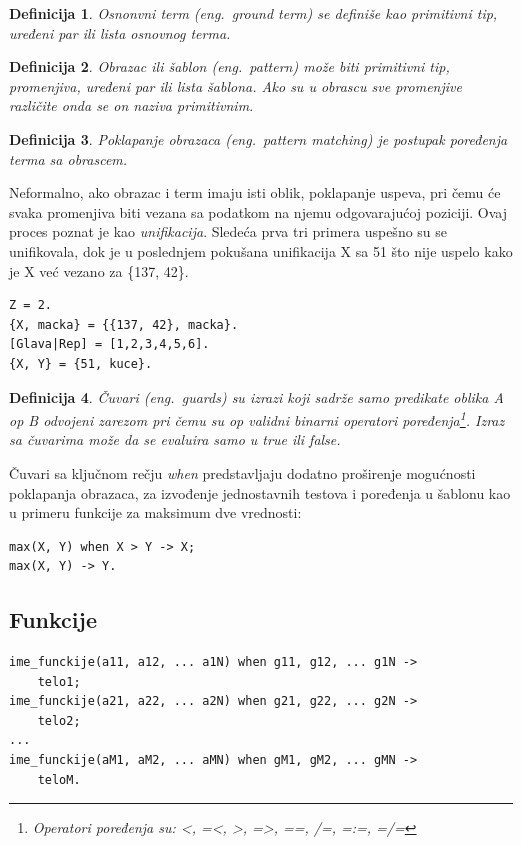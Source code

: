 \documentclass[a4paper]{article}
\newtheorem{definition}{Definicija}
\begin{document}
{\theoremstyle{definition}
\begin{definition}{Osnonvni term (eng.~{\em ground term})}
se definiše kao primitivni tip, uređeni par ili lista osnovnog terma.
\end{definition}

\begin{definition}{Obrazac ili šablon (eng.~{\em pattern})}
može biti primitivni tip, promenjiva, uređeni par ili lista šablona.
Ako su u obrascu sve promenjive različite onda se on naziva primitivnim.
\end{definition}

\begin{definition}{Poklapanje obrazaca (eng.~{\em pattern matching})}
je postupak poređenja terma sa obrascem.
\end{definition}
Neformalno, ako obrazac i term imaju isti oblik, poklapanje uspeva, pri čemu će svaka promenjiva biti vezana sa podatkom na njemu odgovarajućoj poziciji. 
Ovaj proces poznat je kao {\em unifikacija}. Sledeća prva tri primera uspešno su se unifikovala, dok je u poslednjem pokušana unifikacija X sa 51 što nije uspelo kako je X već vezano za \{137, 42\}.

\begin{verbatim}
Z = 2.
{X, macka} = {{137, 42}, macka}.
[Glava|Rep] = [1,2,3,4,5,6].
{X, Y} = {51, kuce}.
\end{verbatim}



\begin{definition}{Čuvari (eng.~{\em guards})}
su izrazi koji sadrže samo predikate oblika A op B odvojeni zarezom pri čemu su op validni binarni operatori poređenja\footnote{Operatori poređenja su: <, =<, >, =>, ==, /=, =:=, =/=}. Izraz sa čuvarima može da se evaluira samo u true ili false.
\end{definition}
Čuvari sa ključnom rečju {\em when} predstavljaju dodatno proširenje mogućnosti poklapanja obrazaca, za izvođenje jednostavnih testova i poređenja u šablonu kao u primeru funkcije za maksimum dve vrednosti:
\begin{verbatim}
max(X, Y) when X > Y -> X;
max(X, Y) -> Y.
\end{verbatim}

\subsection{Funkcije}
\begin{verbatim}
ime_funckije(a11, a12, ... a1N) when g11, g12, ... g1N -> 
	telo1;
ime_funckije(a21, a22, ... a2N) when g21, g22, ... g2N -> 
	telo2;
...
ime_funckije(aM1, aM2, ... aMN) when gM1, gM2, ... gMN -> 
	teloM.
\end{verbatim}


}
\end{document}
